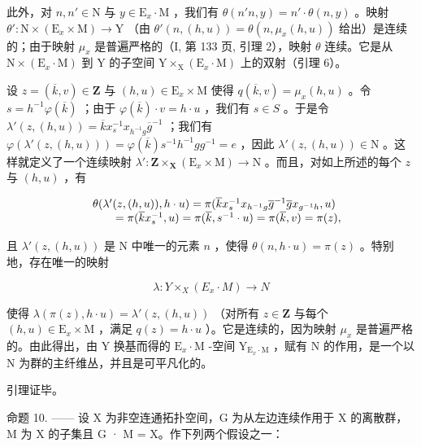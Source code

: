 此外，对 \(n, n' \in \mathrm{N}\) 与 \(y \in \mathrm{E}_x \cdot \mathrm{M}\) ，我们有 \(\theta(n'n, y) = n' \cdot \theta(n, y)\) 。映射 \(\theta'\colon \mathrm{N} \times (\mathrm{E}_x \times \mathrm{M}) \to \mathrm{Y}\) （由 \(\theta'(n, (h, u)) = \theta(n, \mu_x(h, u))\) 给出）是连续的；由于映射 \(\mu_x\) 是普遍严格的（I, 第 133 页, 引理 2），映射 \(\theta\) 连续。它是从 \(\mathrm{N} \times (\mathrm{E}_x \cdot \mathrm{M})\) 到 Y 的子空间 \(\mathrm{Y} \times_{\mathrm{X}} (\mathrm{E}_x \cdot \mathrm{M})\) 上的双射（引理 6）。

设 \(z = (\overline{k}, v) \in \mathbf{Z}\) 与 \((h, u) \in \mathrm{E}_x \times \mathrm{M}\) 使得 \(q(\overline{k}, v) = \mu_x(h, u)\) 。令 \(s = h^{-1}\varphi(\overline{k})\) ；由于 \(\varphi(\overline{k}) \cdot v = h \cdot u\) ，我们有 \(s \in S\) 。于是令 \(\lambda'(z, (h, u)) = \overline{k} x_s^{-1} x_{h^{-1}g} \overline{g}^{-1}\) ；我们有 \(\varphi(\lambda'(z, (h, u))) = \varphi(\overline{k}) s^{-1} h^{-1} gg^{-1} = e\) ，因此 \(\lambda'(z, (h, u)) \in \mathrm{N}\) 。这样就定义了一个连续映射 \(\lambda' \colon \mathbf{Z} \times_{\mathbf{X}} (\mathrm{E}_x \times \mathrm{M}) \to \mathrm{N}\) 。而且，对如上所述的每个 \(z\) 与 \((h, u)\) ，有

\[
\begin{array}{r l} & {\theta (\lambda^ {\prime} (z, (h, u)), h \cdot u) = \pi (\overline {{k}} x _ {s} ^ {- 1} x _ {h ^ {- 1} g} \overline {{g}} ^ {- 1} \overline {{g}} x _ {g ^ {- 1} h}, u)} \\ & {\qquad = \pi (\overline {{k}} x _ {s} ^ {- 1}, u) = \pi (\overline {{k}}, s ^ {- 1} \cdot u) = \pi (\overline {{k}}, v) = \pi (z),} \end{array}
\]

且 \(\lambda'(z,(h,u))\) 是 N 中唯一的元素 \(n\) ，使得 \(\theta(n,h\cdot u)=\pi(z)\) 。特别地，存在唯一的映射

\[
\lambda \colon Y \times_ {X} (E _ {x} \cdot M) \to N
\]

使得 \(\lambda(\pi(z), h \cdot u) = \lambda'(z, (h, u))\) （对所有 \(z \in \mathbf{Z}\) 与每个 \((h, u) \in \mathrm{E}_x \times \mathrm{M}\) ，满足 \(q(z) = h \cdot u\) ）。它是连续的，因为映射 \(\mu_x\) 是普遍严格的。由此得出，由 Y 换基而得的 \(\mathrm{E}_x \cdot \mathrm{M}\) -空间 \(\mathrm{Y}_{\mathrm{E}_x \cdot \mathrm{M}}\) ，赋有 N 的作用，是一个以 N 为群的主纤维丛，并且是可平凡化的。

引理证毕。

命题 10. —— 设 X 为非空连通拓扑空间，G 为从左边连续作用于 X 的离散群，M 为 X 的子集且 G · M = X。作下列两个假设之一：

